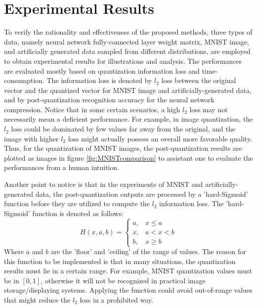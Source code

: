 \documentclass[preprint,10pt]{elsarticle}
\begin{document}
\section{Experimental Results}
\label{sec:experiment}
To verify the rationality and effectiveness of the proposed methods, three types of data, namely neural network fully-connected layer weight matrix, MNIST image, and artificially generated data sampled from different distributions, are employed to obtain experimental results for illustrations and analysis. The performances are evaluated mostly based on quantization information loss and time-consumption. The information loss is denoted by $l_2$ loss between the original vector and the quantized vector for MNIST image and artificially-generated data, and by post-quantization recognition accuracy for the neural network compression. Notice that in some certain scenarios, a high $l_2$ loss may not necessarily mean a deficient performance. For example, in image quantization, the $l_2$ loss could be dominated by few values far away from the original, and the image with higher $l_2$ loss might actually possess an overall more favorable quality. Thus, for the quantization of MNIST images, the post-quantization results are plotted as images in figure \ref{fig:MNISTcomparison} to assistant one to evaluate the performances from a human intuition. \par
Another point to notice is that in the experiments of MNIST and artificially-generated data, the post-quantization outputs are processed by a 'hard-Sigmoid' function before they are utilized to compute the $l_2$ information loss. The 'hard-Sigmoid' function is denoted as follows:
\begin{equation}
H(x,a,b) =
\begin{cases}
a, & x\leq a\\
x, & a<x<b\\
b, & x\geq b
\end{cases}
\end{equation}
Where $a$ and $b$ are the 'floor' and 'ceiling' of the range of values. The reason for this function to be implemented is that in many situations, the quantization results must lie in a certain range. For example, MNIST quantization values must be in $[0,1]$, otherwise it will not be recognized in practical image storage/displaying systems. Applying the function could avoid out-of-range values that might reduce the $l_2$ loss in a prohibited way. \par
\end{document}
